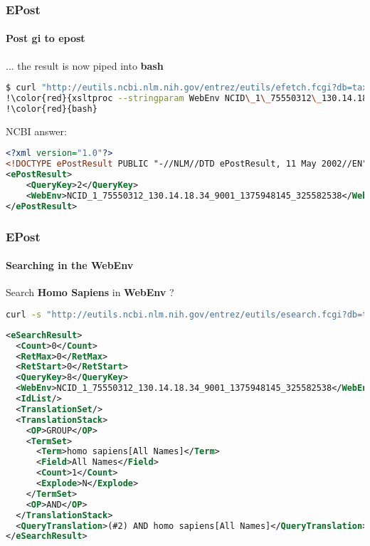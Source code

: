 \documentclass{beamer}
\begin{document}
\begin{frame}[fragile]
\frametitle{EPost}
\framesubtitle{Post gi to epost}
... the result is now piped into {\bf bash}
\begin{lstlisting}[language=bash,basicstyle=\tiny,breaklines=true,escapechar=\!]
$ curl "http://eutils.ncbi.nlm.nih.gov/entrez/eutils/efetch.fcgi?db=taxonomy&!\color{red}{query\_key=1\&WebEnv=NCID\_1\_75550312\_130.14.18.34\_9001\_1375948145\_325582538}!&retmode=xml" |\
!\color{red}{xsltproc --stringparam WebEnv NCID\_1\_75550312\_130.14.18.34\_9001\_1375948145\_325582538 ncbi2epost.xsl}! - |\
!\color{red}{bash}
\end{lstlisting}
NCBI answer:
\begin{lstlisting}[language=xml,basicstyle=\tiny,breaklines=true,escapechar=\%]
<?xml version="1.0"?>
<!DOCTYPE ePostResult PUBLIC "-//NLM//DTD ePostResult, 11 May 2002//EN" "http://www.ncbi.nlm.nih.gov/entrez/query/DTD/ePost_020511.dtd">
<ePostResult>
	<QueryKey>2</QueryKey>
	<WebEnv>NCID_1_75550312_130.14.18.34_9001_1375948145_325582538</WebEnv>
</ePostResult>
\end{lstlisting}

\end{frame}

\begin{frame}[fragile]
\frametitle{EPost}
\framesubtitle{Searching in the WebEnv}
Search {\bf Homo Sapiens} in {\bf WebEnv} ?

\begin{lstlisting}[language=bash,basicstyle=\tiny,breaklines=true,escapechar=\!]
curl -s "http://eutils.ncbi.nlm.nih.gov/entrez/eutils/esearch.fcgi?db=taxonomy&term=!\color{red}{Homo\%20Sapiens}!&usehistory=y&WebEnv=NCID_1_75550312_130.14.18.34_9001_1375948145_325582538&query_key=2"
\end{lstlisting}

\begin{lstlisting}[language=xml,basicstyle=\tiny,breaklines=true,escapechar=\%]
<eSearchResult>
  <Count>0</Count>
  <RetMax>0</RetMax>
  <RetStart>0</RetStart>
  <QueryKey>8</QueryKey>
  <WebEnv>NCID_1_75550312_130.14.18.34_9001_1375948145_325582538</WebEnv>
  <IdList/>
  <TranslationSet/>
  <TranslationStack>
    <OP>GROUP</OP>
    <TermSet>
      <Term>homo sapiens[All Names]</Term>
      <Field>All Names</Field>
      <Count>1</Count>
      <Explode>N</Explode>
    </TermSet>
    <OP>AND</OP>
  </TranslationStack>
  <QueryTranslation>(#2) AND homo sapiens[All Names]</QueryTranslation>
</eSearchResult>
\end{lstlisting}

\end{frame}
\end{document}
